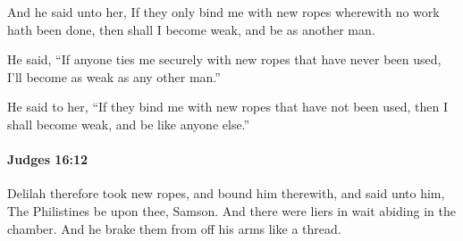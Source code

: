 			\begin{versebox}
					\item[BHS] 
					\item[ASV] And he said unto her, If they only bind me with new ropes wherewith no work hath been done, then shall I become weak, and be as another man.
					\item[NIV] He said, “If anyone ties me securely with new ropes that have never been used, I’ll become as weak as any other man.”
					\item[NRSV] He said to her, “If they bind me with new ropes that have not been used, then I shall become weak, and be like anyone else.”
			\end{versebox}

		\paragraph{Judges 16:12} %
			\label{JUDGES-16-12}

			Delilah therefore took new ropes, and bound him therewith, and said unto him, The Philistines be upon thee, Samson. And there were liers in wait abiding in the chamber. And he brake them from off his arms like a thread.

